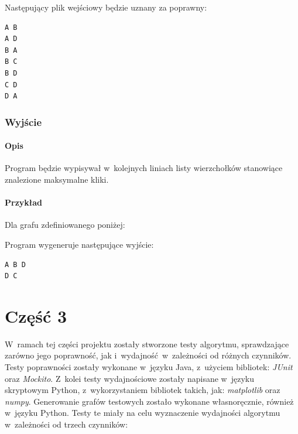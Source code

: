 \documentclass[11pt,a4paper]{article}
\begin{document}
\noindent Następujący plik wejściowy będzie uznany za poprawny:\\
\begin{lstlisting}[caption = Przykładowy plik wejściowy]
A B
A D
B A
B C
B D
C D
D A
\end{lstlisting}

\subsubsection{Wyjście}
\paragraph{Opis} Program będzie wypisywał w~kolejnych liniach listy wierzchołków stanowiące znalezione maksymalne kliki.
\paragraph{Przykład} Dla grafu zdefiniowanego poniżej:\\


\noindent Program wygeneruje następujące wyjście:\\
\begin{lstlisting}[caption = Wynik działania programu]
A B D
D C
\end{lstlisting}

\section{Część 3}
W~ramach tej części projektu zostały stworzone testy algorytmu, sprawdzające zarówno jego poprawność, jak i~wydajność w~zależności od różnych czynników. Testy poprawności zostały wykonane w~języku Java, z~użyciem bibliotek: \textit{JUnit} oraz \textit{Mockito}. Z~kolei testy wydajnościowe zostały napisane w~języku skryptowym Python, z~wykorzystaniem bibliotek takich, jak: \textit{matplotlib} oraz \textit{numpy}. Generowanie grafów testowych zostało wykonane własnoręcznie, również w~języku Python. Testy te miały na celu wyznaczenie wydajności algorytmu w~zależności od trzech czynników:
\end{document}
